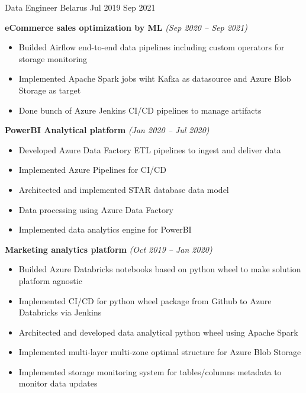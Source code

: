           {Data Engineer}
          {Belarus}
          {Jul 2019}
          {Sep 2021}

\smallskip

\textbf{eCommerce sales optimization by ML} \textit{(Sep 2020 -- Sep 2021)}
\cvexpspace
\begin{itemize}
  \cvitemsep
  \item Builded Airflow end-to-end data pipelines
        including custom operators for storage monitoring
  \item Implemented Apache Spark jobs wiht Kafka as datasource
        and Azure Blob Storage as target
  \item Done bunch of Azure Jenkins CI/CD pipelines to manage artifacts
\end{itemize}

\textbf{PowerBI Analytical platform} \textit{(Jan 2020 -- Jul 2020)}
\cvexpspace
\begin{itemize}
  \cvitemsep
  \item Developed Azure Data Factory ETL pipelines to ingest and deliver data
  \item Implemented Azure Pipelines for CI/CD
  \item Architected and implemented STAR database data model
  \item Data processing using Azure Data Factory
  \item Implemented data analytics engine for PowerBI
\end{itemize}

\textbf{Marketing analytics platform} {\textit{(Oct 2019 -- Jan 2020)}}
\cvexpspace
\begin{itemize}
  \cvitemsep
  \item Builded Azure Databricks notebooks based on python wheel
        to make solution platform agnostic
  \item Implemented CI/CD for python wheel package from Github
        to Azure Databricks via Jenkins
  \item Architected and developed data analytical
        python wheel using Apache Spark
  \item Implemented multi-layer multi-zone optimal
        structure for Azure Blob Storage
  \item Implemented storage monitoring system
        for tables/columns metadata to monitor data updates
\end{itemize}
